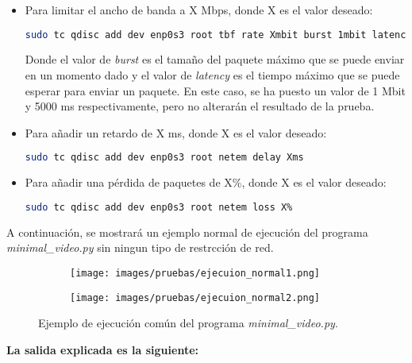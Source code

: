 \begin{itemize}
    \item Para limitar el ancho de banda a X Mbps, donde X es el valor deseado:
    \begin{lstlisting}[language=bash, breaklines=true]
    sudo tc qdisc add dev enp0s3 root tbf rate Xmbit burst 1mbit latency 5000ms
\end{lstlisting}
    Donde el valor de \textit{burst} es el tamaño del paquete máximo que se puede enviar en un momento dado y el valor de \textit{latency} es el tiempo máximo que se puede esperar para enviar un paquete. En este caso, se ha puesto un valor de 1 Mbit y 5000 ms respectivamente, pero no alterarán el resultado de la prueba.
    \item Para añadir un retardo de X ms, donde X es el valor deseado:
    \begin{lstlisting}[language=bash]
    sudo tc qdisc add dev enp0s3 root netem delay Xms
\end{lstlisting}
    \item Para añadir una pérdida de paquetes de X\%, donde X es el valor deseado:
    \begin{lstlisting}[language=bash]
    sudo tc qdisc add dev enp0s3 root netem loss X%
\end{lstlisting}
\end{itemize}

A continuación, se mostrará un ejemplo normal de ejecución del programa \textit{minimal\_video.py} sin ningun tipo de restrcción de red.

\begin{figure}[htbp]
    \centering
    \begin{subfigure}{0.6\textwidth}
        \centering
        \texttt{[image: images/pruebas/ejecuion\_normal1.png]}
    \end{subfigure}
    \hfill
    \begin{subfigure}{0.6\textwidth}
        \centering
        \texttt{[image: images/pruebas/ejecuion\_normal2.png]}
    \end{subfigure}
    \caption{Ejemplo de ejecución común del programa \textit{minimal\_video.py}.}
    \label{fig:ejecucion_doble}
\end{figure}
\vspace{\baselineskip}
\newpage

\textbf{La salida explicada es la siguiente:}
\vspace{\baselineskip}

